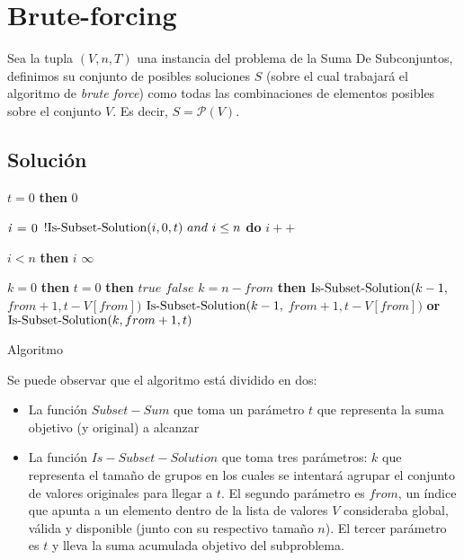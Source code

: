 \section{Brute-forcing}
Sea la tupla $(V, n, T)$ una instancia del problema de la Suma De Subconjuntos, definimos su conjunto de posibles soluciones $S$ (sobre el cual trabajará el algoritmo de \textit{brute force}) como todas las combinaciones de elementos posibles sobre el conjunto $V$. Es decir, $S = \mathcal{P}(V)$.

\subsection{Solución}
\begin{center}
	\begin{minipage}[t]{.49\textwidth}
		\raggedright
		\begin{codebox}
				\li \If $t = 0$ \textbf{then} \Return $0$
				\zi

				\li $\id{i} \gets 0$
				\li \While $!\func{Is-Subset-Solution}(i, 0, t) \ and \ i \leq n$ \textbf{do}
				\Do
					\li $i++$
					\zi
				\End

				\li \If $i < n$ \textbf{then}
				\li \Then
					\Return $i$
					\li
				\Else
					\li \Return $\infty$
				\End
			\End
		\end{codebox}
	\end{minipage}%
	\begin{minipage}[t]{.5\textwidth}
		\raggedleft
		\begin{codebox}
			\Procname{$\proc{Is-Subset-Solution}(k, \ from, \ t)$}
				\li \If $k = 0$ \textbf{then}
				\Then
					\li \If $t = 0$ \textbf{then}
					\li \Then
						\Return $true$
					\li \Else
						\li \Return $false$
					\End
				\li \Else
					\li \If $k = n - from$ \textbf{then}
					\li \Then
						\Return $\func{Is-Subset-Solution}(k - 1,$
						\zi $from + 1, t - V[from])$
					\li \Else
						\li \Return $\func{Is-Subset-Solution}(k - 1,$
						\zi $from + 1, t - V[from])$ \textbf{or}
						\zi $\func{Is-Subset-Solution}(k, from + 1, t)$
					\End
				\End
			\End
		\end{codebox}
		\footnotesize Algoritmo
		\label{fig:algoritmo}
	\end{minipage}
\end{center}
Se puede observar que el algoritmo está dividido en dos:
\begin{itemize}
	\item La función $Subset-Sum$ que toma un parámetro $t$ que representa la suma objetivo (y original) a alcanzar
	\item La función $Is-Subset-Solution$ que toma tres parámetros: $k$ que representa el tamaño de grupos en los cuales se intentará agrupar el conjunto de valores originales para llegar a $t$. El segundo parámetro es $from$, un índice que apunta a un elemento dentro de la lista de valores $V$ consideraba global, válida y disponible (junto con su respectivo tamaño $n$). El tercer parámetro es $t$ y lleva la suma acumulada objetivo del subproblema.
\end{itemize}

